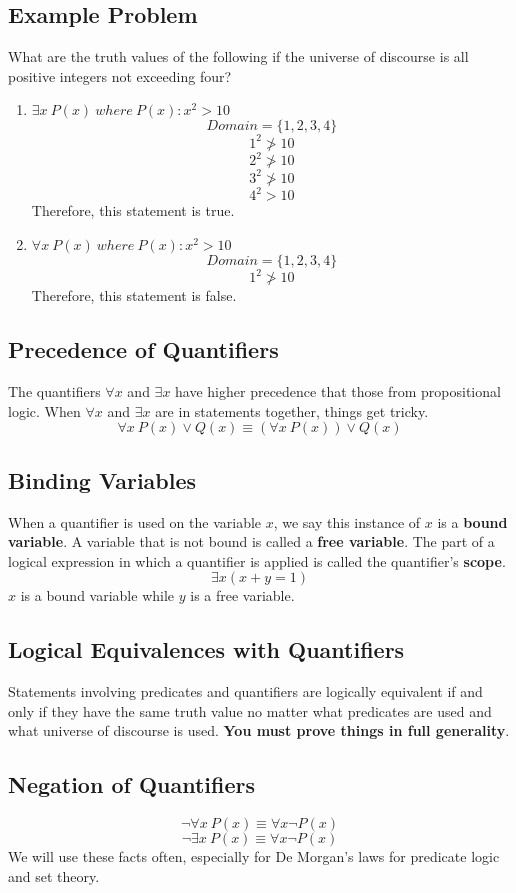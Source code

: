 \documentclass[letterpaper, 12pt]{math}
\begin{document}
\subsection*{Example Problem}
What are the truth values of the following if the universe of discourse is all
positive integers not exceeding four?
\begin{enumerate}
  \item \( \exists x\ P(x)\ where\ P(x):x^{2} > 10 \)
  \[ Domain = \{1, 2, 3, 4\} \]
  \[ 1^{2} \ngtr 10 \]
  \[ 2^{2} \ngtr 10 \]
  \[ 3^{2} \ngtr 10 \]
  \[ 4^{2} > 10 \]
  Therefore, this statement is true.
  \item \( \forall x\ P(x)\ where\ P(x):x^{2} > 10 \)
  \[ Domain = \{1, 2, 3, 4\} \]
  \[ 1^{2} \ngtr 10 \]
  Therefore, this statement is false.
\end{enumerate}

\subsection*{Precedence of Quantifiers}
The quantifiers \( \forall x \) and \( \exists x \) have higher precedence
that those from propositional logic. When \( \forall x \) and \( \exists x \)
are in statements together, things get tricky.
\[ \forall x\ P(x) \vee Q(x) \equiv (\forall x\ P(x)) \vee Q(x) \]

\subsection*{Binding Variables}
When a quantifier is used on the variable \( x \), we say this instance of
\( x \) is a \textbf{bound variable}. A variable that is not bound is called a
\textbf{free variable}. The part of a logical expression in which a quantifier
is applied is called the quantifier's \textbf{scope}.
\[ \exists x (x+y = 1) \]
\( x \) is a bound variable while \( y \) is a free variable.

\subsection*{Logical Equivalences with Quantifiers}
Statements involving predicates and quantifiers are logically equivalent if and
only if they have the same truth value no matter what predicates are used and
what universe of discourse is used. \textbf{You must prove things in full
generality}.

\subsection*{Negation of Quantifiers}
\[ \neg{\forall x\ P(x)} \equiv \forall x \neg{P(x)} \]
\[ \neg{\exists x\ P(x)} \equiv \forall x \neg{P(x)} \]
We will use these facts often, especially for De Morgan's laws for predicate
logic and set theory.
\end{document}
